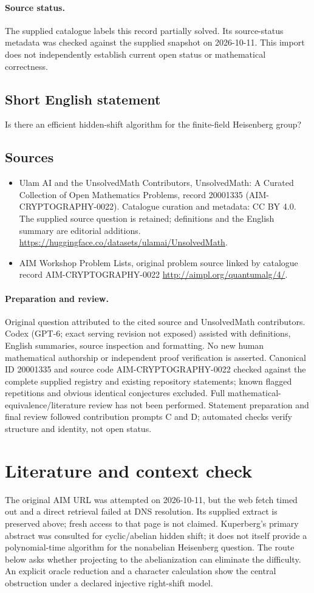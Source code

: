 \documentclass[11pt]{article}
\begin{document}
\paragraph{Source status.}
The supplied catalogue labels this record partially solved. Its source-status metadata was checked against the supplied snapshot on 2026-10-11. This import does not independently establish current open status or mathematical correctness.
\subsection{Short English statement}
Is there an efficient hidden-shift algorithm for the finite-field Heisenberg group?
\subsection{Sources}
\begin{itemize}
\item[S1] Ulam AI and the UnsolvedMath Contributors, UnsolvedMath: A Curated Collection of Open Mathematics Problems, record 20001335 (AIM-CRYPTOGRAPHY-0022). Catalogue curation and metadata: CC BY 4.0. The supplied source question is retained; definitions and the English summary are editorial additions.
\url{https://huggingface.co/datasets/ulamai/UnsolvedMath}.
\item[S2] AIM Workshop Problem Lists, original problem source linked by catalogue record AIM-CRYPTOGRAPHY-0022
\url{http://aimpl.org/quantumalg/4/}.
\end{itemize}
\paragraph{Preparation and review.}
Original question attributed to the cited source and UnsolvedMath contributors. Codex (GPT-6; exact serving revision not exposed) assisted with definitions, English summaries, source inspection and formatting. No new human mathematical authorship or independent proof verification is asserted. Canonical ID 20001335 and source code AIM-CRYPTOGRAPHY-0022 checked against the complete supplied registry and existing repository statements; known flagged repetitions and obvious identical conjectures excluded. Full mathematical-equivalence/literature review has not been performed. Statement preparation and final review followed contribution prompts C and D; automated checks verify structure and identity, not open status.
\label{end:20001335}

\section{Literature and context check}
The original AIM URL was attempted on 2026-10-11, but the web fetch timed out and a direct retrieval failed at DNS resolution. Its supplied extract is preserved above; fresh access to that page is not claimed. Kuperberg's primary abstract was consulted for cyclic/abelian hidden shift; it does not itself provide a polynomial-time algorithm for the nonabelian Heisenberg question. The route below asks whether projecting to the abelianization can eliminate the difficulty. An explicit oracle reduction and a character calculation show the central obstruction under a declared injective right-shift model.
\end{document}
